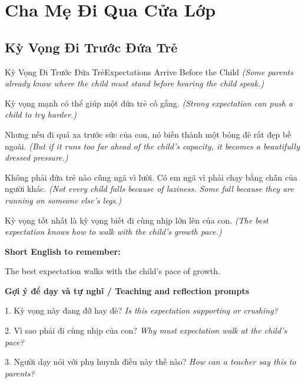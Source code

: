 \chapter{Cha Mẹ Đi Qua Cửa Lớp}

\section{Kỳ Vọng Đi Trước Đứa Trẻ}
\begin{truyen}{Kỳ Vọng Đi Trước Đứa Trẻ}{Expectations Arrive Before the Child}
\textit{(Some parents already know where the child must stand before hearing the child speak.)}

Kỳ vọng mạnh có thể giúp một đứa trẻ cố gắng.
\textit{(Strong expectation can push a child to try harder.)}

Nhưng nếu đi quá xa trước sức của con, nó biến thành một bóng đè rất đẹp bề ngoài.
\textit{(But if it runs too far ahead of the child’s capacity, it becomes a beautifully dressed pressure.)}

Không phải đứa trẻ nào cũng ngã vì lười. Có em ngã vì phải chạy bằng chân của người khác.
\textit{(Not every child falls because of laziness. Some fall because they are running on someone else’s legs.)}

\end{truyen}

\begin{baihoc}
Kỳ vọng tốt nhất là kỳ vọng biết đi cùng nhịp lớn lên của con.
\textit{(The best expectation knows how to walk with the child’s growth pace.)}
\end{baihoc}

\begin{ghinhoanh}
\textbf{Short English to remember:}

The best expectation walks with the child’s pace of growth.

\end{ghinhoanh}

\begin{tuhocnhanh}
\textbf{Gợi ý để dạy và tự nghĩ / Teaching and reflection prompts}

1. Kỳ vọng này đang đỡ hay đè? \textit{Is this expectation supporting or crushing?}

2. Vì sao phải đi cùng nhịp của con? \textit{Why must expectation walk at the child’s pace?}

3. Người dạy nói với phụ huynh điều này thế nào? \textit{How can a teacher say this to parents?}
\end{tuhocnhanh}
\ngancach

